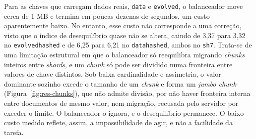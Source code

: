 Para as chaves que carregam dados reais, \texttt{data} e \texttt{evolved}, o balanceador move cerca de 1 MB e termina em poucas dezenas de segundos, um custo aparentemente baixo. No entanto, esse custo não corresponde a uma correção, visto que o índice de desequilíbrio quase não se altera, caindo de 3,37 para 3,32 no \texttt{evolved}\textperiodcentered\texttt{hashed} e de 6,25 para 6,21 no \texttt{data}\textperiodcentered\texttt{hashed}, ambos no \texttt{sh7}. Trata-se de uma limitação estrutural em que o balanceador só reequilibra migrando \textit{chunks} inteiros entre \textit{shards}, e um \textit{chunk} só pode ser dividido numa fronteira entre valores de chave distintos. Sob baixa cardinalidade e assimetria, o valor dominante sozinho excede o tamanho de um \textit{chunk} e forma um \textit{jumbo chunk} (Figura~\ref{fig:res-chunks}), que não admite divisão, por não haver fronteira interna entre documentos de mesmo valor, nem migração, recusada pelo servidor por exceder o limite. O balanceador o ignora, e o desequilíbrio permanece. O baixo custo medido reflete, assim, a impossibilidade de agir, e não a facilidade da tarefa.

